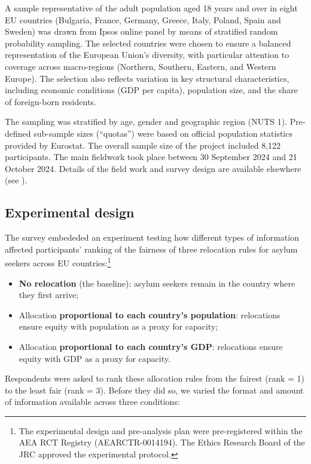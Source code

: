 \documentclass[
  12pt,
  a4paper,
]{article}
\providecommand{\tightlist}{%
  \setlength{\itemsep}{0pt}\setlength{\parskip}{0pt}}
\begin{document}
A sample representative of the adult population aged 18 years and over in eight EU countries (Bulgaria, France, Germany, Greece, Italy, Poland, Spain and Sweden) was drawn from Ipsos online panel by means of stratified random probability sampling. The selected countries were chosen to ensure a balanced representation of the European Union's diversity, with particular attention to coverage across macro-regions (Northern, Southern, Eastern, and Western Europe). The selection also reflects variation in key structural characteristics, including economic conditions (GDP per capita), population size, and the share of foreign-born residents.

The sampling was stratified by age, gender and geographic region (NUTS 1). Pre-defined sub-sample sizes (``quotas'') were based on official population statistics provided by Eurostat. The overall sample size of the project included 8,122 participants. The main fieldwork took place between 30 September 2024 and 21 October 2024. Details of the field work and survey design are available elsewhere (see ).

\subsection{Experimental design}\label{experimental-design}

The survey embededed an experiment testing how different types of information affected participants' ranking of the fairness of three relocation rules for asylum seekers across EU countries:\footnote{
  The experimental design and pre-analysis plan were pre-registered within the AEA RCT Registry (AEARCTR-0014194). The Ethics Research Board of the JRC approved the experimental protocol.}

\begin{itemize}
\tightlist
\item
  \textbf{No relocation} (the baseline): asylum seekers remain in the country where they first arrive;
\item
  Allocation \textbf{proportional to each country's population}: relocations ensure equity with population as a proxy for capacity;
\item
  Allocation \textbf{proportional to each country's GDP}: relocations ensure equity with GDP as a proxy for capacity.
\end{itemize}

Respondents were asked to rank these allocation rules from the fairest (rank = 1) to the least fair (rank = 3). Before they did so, we varied the format and amount of information available across three conditions:
\end{document}

